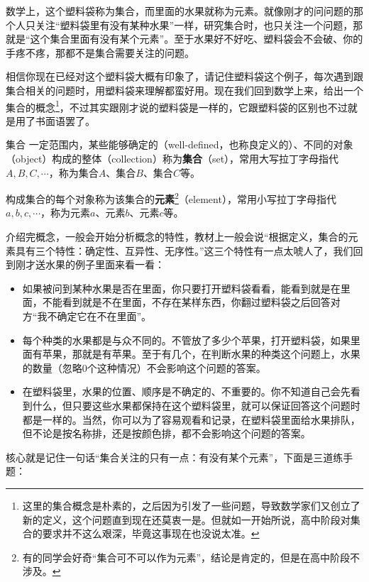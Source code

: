 数学上，这个塑料袋称为集合，而里面的水果就称为元素。就像刚才的问问题的那个人只关注“塑料袋里有没有某种水果”一样，研究集合时，也只关注一个问题，那就是“这个集合里面有没有某个元素”。至于水果好不好吃、塑料袋会不会破、你的手疼不疼，那都不是集合需要关注的问题。

相信你现在已经对这个塑料袋大概有印象了，请记住塑料袋这个例子，每次遇到跟集合相关的问题时，用塑料袋来理解都蛮好用。现在我们回到数学上来，给出一个集合的概念\footnote{这里的集合概念是朴素的，之后因为引发了一些问题，导致数学家们又创立了新的定义，这个问题直到现在还莫衷一是。但就如一开始所说，高中阶段对集合的要求并不这么艰深，毕竟这事现在也没说太准。}，不过其实跟刚才说的塑料袋是一样的，它跟塑料袋的区别也不过就是用了书面语罢了。

\begin{definition}{集合}
一定范围内，某些能够确定的（well-defined，也称良定义的）、不同的对象（object）构成的整体（collection）称为\textbf{集合}（set），常用大写拉丁字母指代$A,B,C,\cdots$，称为集合$A$、集合$B$、集合$C$等。

构成集合的每个对象称为该集合的\textbf{元素}\footnote{有的同学会好奇“集合可不可以作为元素”，结论是肯定的，但是在高中阶段不涉及。}（element），常用小写拉丁字母指代$a,b,c,\cdots$，称为元素$a$、元素$b$、元素$c$等。
\end{definition}

介绍完概念，一般会开始分析概念的特性，教材上一般会说“根据定义，集合的元素具有三个特性：确定性、互异性、无序性。”这三个特性有一点太唬人了，我们回到刚才送水果的例子里面来看一看：

\begin{itemize}
\item 如果被问到某种水果是否在里面，你只要打开塑料袋看看，能看到就是在里面，不能看到就是不在里面，不存在某样东西，你翻过塑料袋之后回答对方“我不确定它在不在里面”。
\item 每个种类的水果都是与众不同的。不管放了多少个苹果，打开塑料袋，如果里面有苹果，那就是有苹果。至于有几个，在判断水果的种类这个问题上，水果的数量（忽略0个这种情况）不会影响这个问题的答案。
\item 在塑料袋里，水果的位置、顺序是不确定的、不重要的。你不知道自己会先看到什么，但只要这些水果都保持在这个塑料袋里，就可以保证回答这个问题时都是一样的。当然，你可以为了容易观看和记录，在塑料袋里面给水果排队，但不论是按名称排，还是按颜色排，都不会影响这个问题的答案。
\end{itemize}

核心就是记住一句话“集合关注的只有一点：有没有某个元素”，下面是三道练手题：

